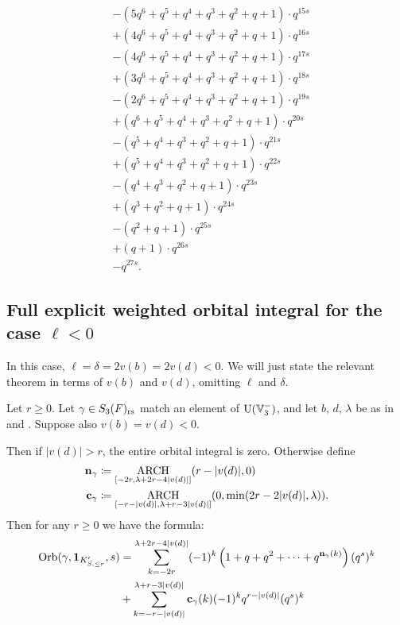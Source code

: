 \begin{example}
\begin{align*}
    &- (5q^6 + q^5 + q^4 + q^3 + q^2 + q + 1) \cdot q^{15s} \\
    &+ (4q^6 + q^5 + q^4 + q^3 + q^2 + q + 1) \cdot q^{16s} \\
    &- (4q^6 + q^5 + q^4 + q^3 + q^2 + q + 1) \cdot q^{17s} \\
    &+ (3q^6 + q^5 + q^4 + q^3 + q^2 + q + 1) \cdot q^{18s} \\
    &- (2q^6 + q^5 + q^4 + q^3 + q^2 + q + 1) \cdot q^{19s} \\
    &+ (q^6 + q^5 + q^4 + q^3 + q^2 + q + 1) \cdot q^{20s} \\
    &- (q^5 + q^4 + q^3 + q^2 + q + 1) \cdot q^{21s} \\
    &+ (q^5 + q^4 + q^3 + q^2 + q + 1) \cdot q^{22s} \\
    &- (q^4 + q^3 + q^2 + q + 1) \cdot q^{23s} \\
    &+ (q^3 + q^2 + q + 1) \cdot q^{24s} \\
    &- (q^2 + q + 1) \cdot q^{25s} \\
    &+ (q + 1) \cdot q^{26s} \\
    &- q^{27s}.
  \end{align*}
\end{example}


\subsection{Full explicit weighted orbital integral for the case $\ell < 0$}
In this case, $\ell = \delta = 2v(b) = 2v(d) < 0$.
We will just state the relevant theorem in terms of $v(b)$ and $v(d)$, omitting $\ell$ and $\delta$.
\begin{theorem}
  \label{thm:full_orbital_ell_neg}
  Let $r \ge 0$.
  Let $\gamma \in S_3(F)_{\mathrm{rs}}$ match an element of $\operatorname{U}(\mathbb V_3^-)$,
  and let $b$, $d$, $\lambda$ be as in
   and .
  Suppose also $v(b) = v(d) < 0$.

  Then if $|v(d)| > r$, the entire orbital integral is zero.
  Otherwise define
  \begin{align*}
    \mathbf n_\gamma &\coloneqq \operatorname*{ARCH}_{[-2r, \lambda+2r-4|v(d)|]}(r-|v(d)|, 0) \\
    \mathbf c_\gamma &\coloneqq \operatorname*{ARCH}_{[-r-|v(d)|, \lambda+r-3|v(d)|]} (0, \min(2r-2|v(d)|, \lambda)).
  \end{align*}
  Then for any $r \ge 0$ we have the formula:
  \begin{align*}
    \operatorname{Orb}(\gamma, \mathbf{1}_{K'_{S, \le r}}, s)
    &= \sum_{k = -2r}^{\lambda + 2r-4|v(d)|}
    (-1)^k \left( 1 + q + q^2 + \dots + q^{\mathbf n_{\gamma}(k)} \right) (q^s)^k \\
    &+ \sum_{k = -r-|v(d)|}^{\lambda+r-3|v(d)|} \mathbf c_\gamma(k) (-1)^k q^{r-|v(d)|} (q^s)^k \\
  \end{align*}
\end{theorem}

